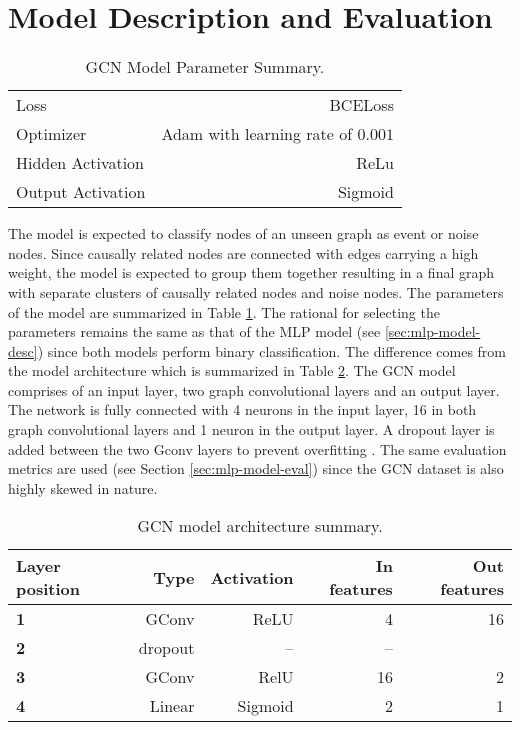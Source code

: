 \section{Model Description and Evaluation}
\label{sec:gcn-model-desc-eval}

\begin{table}[htb]
  \centering
  \caption{GCN Model Parameter Summary.}
  \begin{tabular}{lr}
    \hline
    Loss & BCELoss \\
    Optimizer & Adam with learning rate of $0.001$ \\
    Hidden Activation & ReLu \\
    Output Activation & Sigmoid \\
    \hline
  \end{tabular}
  \label{tab:gcn-model-param}
\end{table}

The model is expected to classify nodes of an unseen graph as event or
noise nodes. Since causally related nodes are connected with edges
carrying a high weight, the model is expected to group them together
resulting in a final graph with separate clusters of causally related
nodes and noise nodes. The parameters of the model are summarized in
Table \ref{tab:gcn-model-param}. The rational for selecting the
parameters remains the same as that of the MLP model (see
\ref{sec:mlp-model-desc}) since both models perform binary
classification. The difference comes from the model architecture which
is summarized in Table \ref{tab:gcn-model-arch}. The GCN model
comprises of an input layer, two graph convolutional layers and an
output layer. The network is fully connected with 4 neurons in the
input layer, 16 in both graph convolutional layers and 1 neuron in the
output layer. A dropout layer is added between the two Gconv layers to
prevent overfitting \cite{srivastava14dropout}. The same evaluation
metrics are used (see Section \ref{sec:mlp-model-eval}) since the GCN
dataset is also highly skewed in nature.

\begin{table}
  \centering
  \caption{GCN model architecture summary.}
  \begin{tabular}{lrrrr}
    \hline
    Layer position & Type & Activation & In features & Out features \\
    \hline
    \textbf{1} & GConv & ReLU & 4 & 16 \\
    \textbf{2} & dropout & -- & -- \\
    \textbf{3} & GConv & RelU & 16 & 2 \\
    \textbf{4} & Linear & Sigmoid & 2 & 1 \\
    \hline
  \end{tabular}
  \label{tab:gcn-model-arch}
\end{table}

